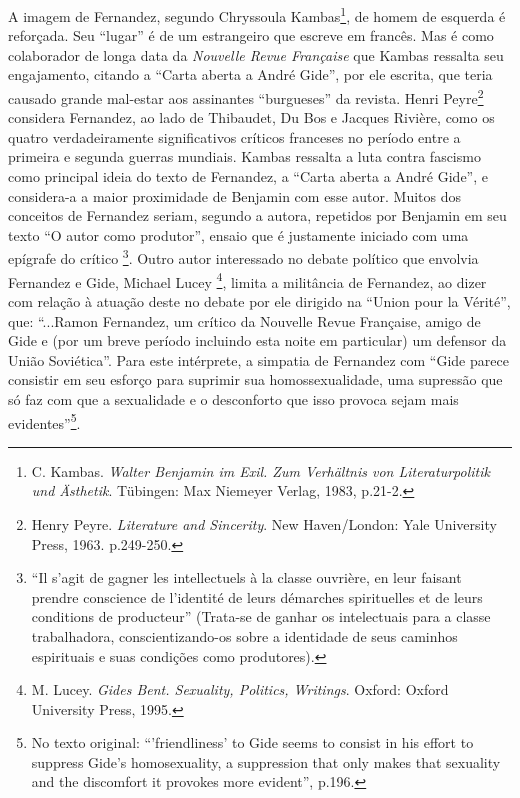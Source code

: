 A imagem de Fernandez, segundo Chryssoula Kambas\footnote{C. Kambas.
  \emph{Walter Benjamin im Exil. Zum Verhältnis von Literaturpolitik und
  Ästhetik}. Tübingen: Max Niemeyer Verlag, 1983, p.21-2.}, de homem de
esquerda é reforçada. Seu ``lugar'' é de um estrangeiro que escreve em
francês. Mas é como colaborador de longa data da \emph{Nouvelle Revue
Française} que Kambas ressalta seu engajamento, citando a ``Carta aberta
a André Gide'', por ele escrita, que teria causado grande mal-estar aos
assinantes ``burgueses'' da revista. Henri Peyre\footnote{Henry Peyre.
  \emph{Literature and Sincerity}. New Haven/London: Yale University
  Press, 1963. p.249-250.} considera Fernandez, ao lado de Thibaudet, Du
Bos e Jacques Rivière, como os quatro verdadeiramente significativos
críticos franceses no período entre a primeira e segunda guerras
mundiais. Kambas ressalta a luta contra fascismo como principal ideia do
texto de Fernandez, a ``Carta aberta a André Gide'', e considera-a a
maior proximidade de Benjamin com esse autor. Muitos dos conceitos de
Fernandez seriam, segundo a autora, repetidos por Benjamin em seu texto
``O autor como produtor'', ensaio que é justamente iniciado com uma
epígrafe do crítico \footnote{``Il s'agit de gagner les intellectuels à
  la classe ouvrière, en leur faisant prendre conscience de l'identité
  de leurs démarches spirituelles et de leurs conditions de producteur''
  (Trata-se de ganhar os intelectuais para a classe trabalhadora,
  conscientizando-os sobre a identidade de seus caminhos espirituais e
  suas condições como produtores).}. Outro autor interessado no debate
político que envolvia Fernandez e Gide, Michael Lucey \footnote{M.
  Lucey. \emph{Gides Bent. Sexuality, Politics, Writings}. Oxford:
  Oxford University Press, 1995.}, limita a militância de Fernandez, ao
dizer com relação à atuação deste no debate por ele dirigido na ``Union
pour la Vérité'', que: ``...Ramon Fernandez, um crítico da Nouvelle
Revue Française, amigo de Gide e (por um breve período incluindo esta
noite em particular) um defensor da União Soviética''. Para este
intérprete, a simpatia de Fernandez com ``Gide parece consistir em seu
esforço para suprimir sua homossexualidade, uma supressão que só faz com
que a sexualidade e o desconforto que isso provoca sejam mais
evidentes''\footnote{No texto original: ``'friendliness' to Gide seems
  to consist in his effort to suppress Gide's homosexuality, a
  suppression that only makes that sexuality and the discomfort it
  provokes more evident'', p.196.}.

